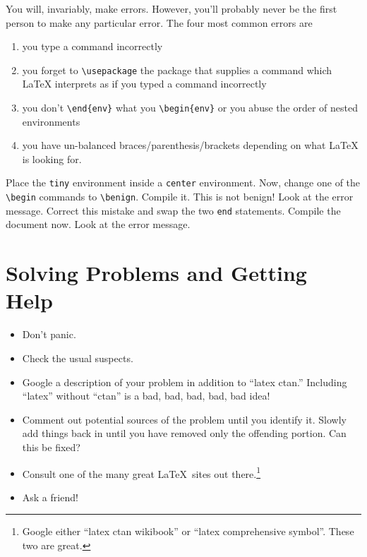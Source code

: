 You will, invariably, make errors. However, you'll probably never be
the first person to make any particular error. The four most common
errors are
\begin{enumerate}
\item you type a command incorrectly

\item you forget to \verb=\usepackage= the package that supplies a command which
  \LaTeX{} interprets as if you typed a command incorrectly

\item you don't \verb=\end{env}= what you \verb=\begin{env}= or you abuse the
  order of nested environments

\item you have un-balanced braces/parenthesis/brackets depending on
  what \LaTeX{} is looking for.

\end{enumerate}

Place the \texttt{tiny} environment inside a \texttt{center}
  environment. Now, change one of the \verb=\begin= commands to
    \verb=\benign=. Compile it. This is not benign! Look at the error
    message. Correct this mistake and swap the two \texttt{end}
    statements. Compile the document now. Look at the error message.


\section{Solving Problems and Getting Help}

\begin{itemize}
\item Don't panic.
\item Check the usual suspects.
\item Google a description of your problem in addition to ``latex
  ctan.'' Including ``latex'' without ``ctan'' is a bad, bad, bad,
  bad, bad idea!
\item Comment out potential sources of the problem until you
  identify it. Slowly add things back in until you have removed only
  the offending portion. Can this be fixed?


\item Consult one of the many great \LaTeX~sites out there.\footnote{Google
    either ``latex ctan wikibook'' or ``latex comprehensive symbol''. These two
    are great.}

\item Ask a friend!


\end{itemize}


